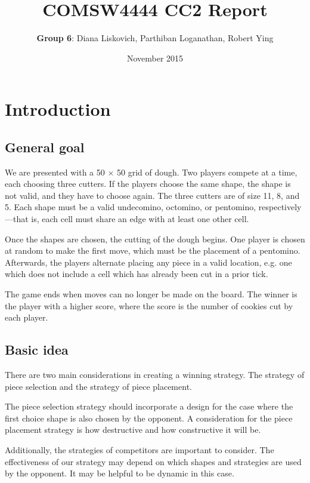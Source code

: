\documentclass{scrartcl}
\title{COMSW4444 CC2 Report}
\author{
\textbf{Group 6}: Diana Liskovich, Parthiban Loganathan, Robert Ying}
\date{November 2015}
\begin{document}
\maketitle

\tableofcontents

\pagebreak

\section{Introduction} %

\subsection{General goal}
We are presented with a 50 $\times$ 50 grid of dough. Two players compete at a time, each choosing three cutters. If the players choose the same shape, the shape is not valid, and they have to choose again. The three cutters are of size 11, 8, and 5. Each shape must be a valid undecomino, octomino, or pentomino, respectively---that is, each cell must share an edge with at least one other cell.

Once the shapes are chosen, the cutting of the dough begins. One player is chosen at random to make the first move, which must be the placement of a pentomino. Afterwards, the players alternate placing any piece in a valid location, e.g. one which does not include a cell which has already been cut in a prior tick.

The game ends when moves can no longer be made on the board. The winner is the player with a higher score, where the score is the number of cookies cut by each player.

\subsection{Basic idea}
There are two main considerations in creating a winning strategy. The strategy of piece selection and the strategy of piece placement. 

The piece selection strategy should incorporate a design for the case where the first choice shape is also chosen by the opponent. A consideration for the piece placement strategy is how destructive and how constructive it will be. 

Additionally, the strategies of competitors are important to consider. The effectiveness of our strategy may depend on which shapes and strategies are used by the opponent. It may be helpful to be dynamic in this case.
\end{document}
